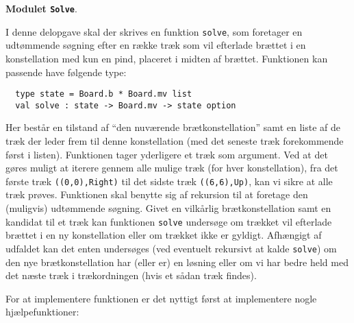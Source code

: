 \textbf{Modulet \texttt{Solve}}.

I denne delopgave skal der skrives en funktion \lstinline{solve}, som foretager en udtømmende søgning efter en række træk som vil efterlade brættet i en konstellation med kun en pind, placeret i midten af brættet. Funktionen kan passende have følgende type:
\begin{lstlisting}
  type state = Board.b * Board.mv list
  val solve : state -> Board.mv -> state option
\end{lstlisting}

Her består en tilstand af ``den nuværende brætkonstellation'' samt en
liste af de træk der leder frem til denne konstellation (med det
seneste træk forekommende først i listen). Funktionen tager yderligere
et træk som argument. Ved at det gøres muligt at iterere gennem alle
mulige træk (for hver konstellation), fra det første
træk \lstinline{((0,0),Right)} til det sidste
træk \lstinline{((6,6),Up)}, kan vi sikre at alle træk
prøves. Funktionen skal benytte sig af rekursion til at foretage den
(muligvis) udtømmende søgning. Givet en vilkårlig brætkonstellation
samt en kandidat til et træk kan funktionen \lstinline{solve}
undersøge om trækket vil efterlade brættet i en ny konstellation eller
om trækket ikke er gyldigt. Afhængigt af udfaldet kan det enten
undersøges (ved eventuelt rekursivt at kalde \lstinline{solve}) om den nye
brætkonstellation har (eller er) en løsning eller om vi har bedre held med det
næste træk i trækordningen (hvis et sådan træk findes).

For at implementere funktionen er det nyttigt først at implementere nogle hjælpefunktioner:

